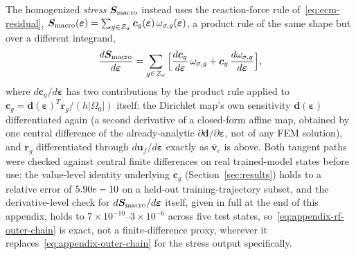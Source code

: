 \documentclass[10pt,a4paper]{article}
\begin{document}
The homogenized \emph{stress} $\bm S_{\rm macro}$ instead uses the
reaction-force rule of~\eqref{eq:ecm-residual}, $\bm
S_{\rm macro}(\bm\varepsilon)=\sum_{g\in\mathcal Z_\sigma}\bm
c_g(\bm\varepsilon)\,\omega_{\sigma,g}(\bm\varepsilon)$, a product rule of
the same shape but over a different integrand,
\begin{equation}
 \frac{d\bm S_{\rm macro}}{d\bm\varepsilon}=\sum_{g\in\mathcal
 Z_\sigma}\Big[\frac{d\bm c_g}{d\bm\varepsilon}\,\omega_{\sigma,g}+\bm
 c_g\,\frac{d\omega_{\sigma,g}}{d\bm\varepsilon}\Big],
 \label{eq:appendix-rf-outer-chain}
\end{equation}
where $d\bm c_g/d\bm\varepsilon$ has two contributions by the product
rule applied to $\bm c_g=\bm d(\bm\varepsilon)^T\bm r_g/(h|\Omega_0|)$
itself: the Dirichlet map's own sensitivity $\bm d(\bm\varepsilon)$
differentiated again (a second derivative of a closed-form affine map,
obtained by one central difference of the already-analytic
$\partial\bm d/\partial\bm\varepsilon$, not of any FEM solution), and
$\bm r_g$ differentiated through $d\bm u_f/d\bm\varepsilon$ exactly as
$\overline{\bm v}_e$ is above. Both tangent paths were checked against
central finite differences on real trained-model states before use: the
value-level identity underlying $\bm c_g$ (Section~\ref{sec:results})
holds to a relative error of $5.90e-10$ on a
held-out training-trajectory subset, and the derivative-level check for
$d\bm S_{\rm macro}/d\bm\varepsilon$ itself, given in full at the end of
this appendix, holds to $7\times10^{-10}$--$3\times10^{-6}$ across five
test states, so~\eqref{eq:appendix-rf-outer-chain} is exact, not a
finite-difference proxy, wherever it replaces~\eqref{eq:appendix-outer-chain}
for the stress output specifically.
\end{document}
